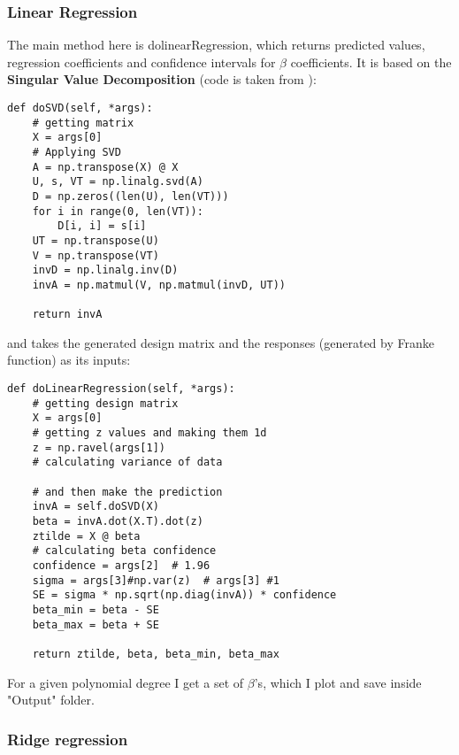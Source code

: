 \subsubsection{Linear Regression}
The main method here is dolinearRegression, which returns predicted values, regression coefficients and confidence intervals for $\beta$ coefficients. It is based on the \textbf{Singular Value Decomposition} (code is taken from \cite{Morten}):
\begin{lstlisting}
def doSVD(self, *args):
    # getting matrix
    X = args[0]
    # Applying SVD
    A = np.transpose(X) @ X
    U, s, VT = np.linalg.svd(A)
    D = np.zeros((len(U), len(VT)))
    for i in range(0, len(VT)):
        D[i, i] = s[i]
    UT = np.transpose(U)
    V = np.transpose(VT)
    invD = np.linalg.inv(D)
    invA = np.matmul(V, np.matmul(invD, UT))

    return invA
\end{lstlisting}
and takes the generated design matrix and the responses (generated by Franke function) as its inputs:
\begin{lstlisting}
def doLinearRegression(self, *args):
    # getting design matrix
    X = args[0]
    # getting z values and making them 1d
    z = np.ravel(args[1])
    # calculating variance of data

    # and then make the prediction
    invA = self.doSVD(X)
    beta = invA.dot(X.T).dot(z)
    ztilde = X @ beta
    # calculating beta confidence
    confidence = args[2]  # 1.96
    sigma = args[3]#np.var(z)  # args[3] #1
    SE = sigma * np.sqrt(np.diag(invA)) * confidence
    beta_min = beta - SE
    beta_max = beta + SE

    return ztilde, beta, beta_min, beta_max
\end{lstlisting}
For a given polynomial degree I get a set of $\beta$'s, which I plot and save inside "Output" folder.

\subsubsection{Ridge regression}

